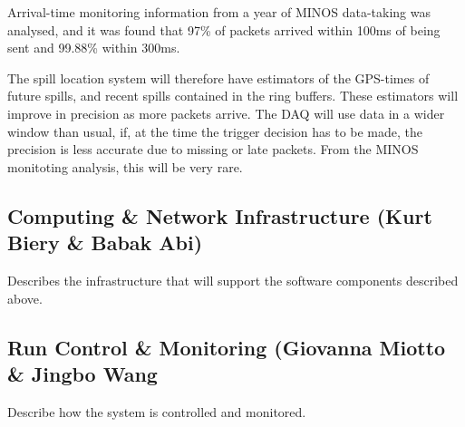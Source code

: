 Arrival-time monitoring information from a year of MINOS data-taking
was analysed, and it was found that 97\% of packets arrived within
100\/ms of being sent and 99.88\% within 300\/ms.

The spill location system will therefore have estimators of the
GPS-times of future spills, and recent spills contained in the ring
buffers. These estimators will improve in precision as more packets
arrive.  The DAQ will use data in a wider window than usual, if, at
the time the trigger decision has to be made, the precision is less
accurate due to missing or late packets.  From the MINOS monitoting
analysis, this will be very rare.

\subsection{Computing \& Network Infrastructure (Kurt Biery \& Babak Abi)}
\label{sec:fdsp-daq-infra}

Describes the infrastructure that will support the software components described above.

\subsection{Run Control \& Monitoring (Giovanna Miotto \& Jingbo Wang}
\label{sec:fdsp-daq-tcm}

Describe how the system is controlled and monitored.

